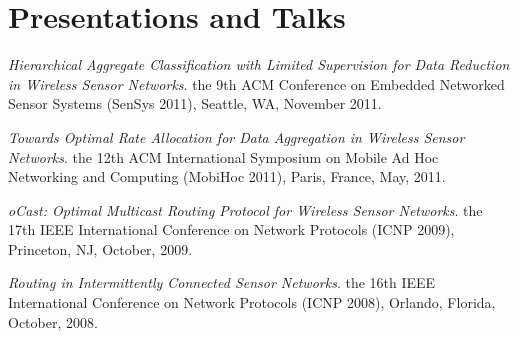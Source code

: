 
\section{\sc Presentations and Talks}
\emph{Hierarchical Aggregate Classification with Limited Supervision
for Data Reduction in Wireless Sensor Networks}. \textsf{the 9th ACM
Conference on Embedded Networked Sensor Systems (SenSys 2011)},
Seattle, WA, November 2011.

\emph{Towards Optimal Rate Allocation for Data Aggregation in
Wireless Sensor Networks}. \textsf{the 12th ACM International
Symposium on Mobile Ad Hoc Networking and Computing (MobiHoc 2011)},
Paris, France, May, 2011.

\emph{oCast: Optimal Multicast Routing Protocol for Wireless Sensor
Networks}. \textsf{the 17th IEEE International Conference on Network
Protocols (ICNP 2009)}, Princeton, NJ, October, 2009.

\emph{Routing in Intermittently Connected Sensor Networks}.
\textsf{the 16th IEEE International Conference on Network Protocols
(ICNP 2008)}, Orlando, Florida, October, 2008.
